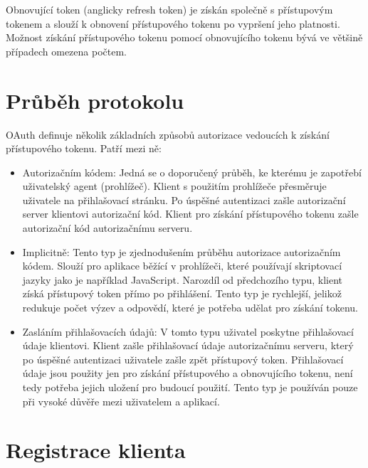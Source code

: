 \documentclass[]{fithesis3}
\begin{document}
	Obnovující token (anglicky refresh token) je získán společně s přístupovým tokenem a slouží k 		obnovení přístupového tokenu po vypršení jeho platnosti. Možnost získání přístupového 			tokenu pomocí obnovujícího tokenu bývá ve většině případech omezena počtem. 

	\section{Průběh protokolu}

	OAuth definuje několik základních způsobů autorizace vedoucích k získání přístupového 			tokenu. Patří mezi ně:

		\begin{itemize}
 		\item Autorizačním kódem:
  		\newline
		Jedná se o doporučený průběh, ke kterému je zapotřebí uživatelský agent 						(prohlížeč). Klient s použitím prohlížeče přesměruje uživatele na přihlašovací stránku. Po 			úspěšné autentizaci zašle autorizační server klientovi autorizační kód. Klient pro získání 			přístupového tokenu zašle autorizační kód autorizačnímu serveru.
  		\item Implicitně:
  		\newline
		Tento typ je zjednodušením průběhu autorizace autorizačním kódem. Slouží pro aplikace 			běžící v prohlížeči, které používají skriptovací jazyky jako je například JavaScript. Narozdíl 		od předchozího typu, klient získá přístupový token přímo po přihlášení. Tento typ je 				rychlejší,	jelikož redukuje počet výzev a odpovědí, které je potřeba udělat pro získání 				tokenu.
 	 	\item Zasláním přihlašovacích údajů:
  		\newline
		V tomto typu uživatel poskytne přihlašovací údaje klientovi. Klient zašle přihlašovací údaje 		autorizačnímu serveru, který po úspěšné autentizaci uživatele zašle zpět přístupový 				token. Přihlašovací údaje jsou použity jen pro získání přístupového a obnovujícího tokenu, 			není tedy potřeba jejich uložení pro budoucí použití. Tento typ je používán pouze při 				vysoké důvěře mezi uživatelem a aplikací. 
		\end{itemize}
		
	\newpage

	\section{Registrace klienta}
\end{document}

